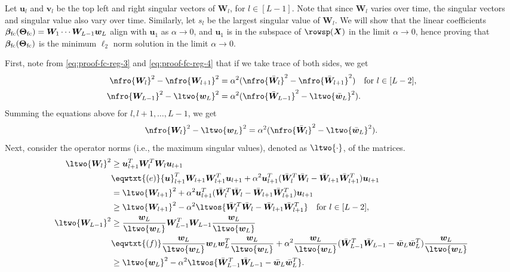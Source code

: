\documentclass{article} %
\def\vu{{\bm{u}}}
\def\vv{{\bm{v}}}
\def\vw{{\bm{w}}}
\def\mW{{\bm{W}}}
\def\mX{{\bm{X}}}
\newcommand{\vbeta}{{\bm{\beta}}}
\newcommand{\vbetafc}{\vbeta_{\rm fc}}
\newcommand{\bTheta}{\bm{\Theta}}
\newcommand{\bThetafc}{\bTheta_{\rm fc}}
\begin{document}
Let $\vu_l$ and $\vv_l$ be the top left and right singular vectors of $\mW_l$, for $l \in [L-1]$. Note that since $\mW_l$ varies over time, the singular vectors and singular value also vary over time. Similarly, let $s_l$ be the largest singular value of $\mW_l$. We will show that the linear coefficients $\vbetafc(\bThetafc) = \mW_1\cdots\mW_{L-1}\vw_L$ align with $\vu_1$ as $\alpha \to 0$, and $\vu_1$ is in the subspace of $\rowsp(\mX)$ in the limit $\alpha \to 0$, hence proving that $\vbetafc(\bThetafc)$ is the minimum $\ell_2$ norm solution in the limit $\alpha \to 0$.

First, note from \eqref{eq:proof-fc-reg-3} and \eqref{eq:proof-fc-reg-4} that if we take trace of both sides, we get
\begin{align*}
    \nfro{\mW_l}^2 - \nfro{\mW_{l+1}}^2 &= \alpha^2 (\nfro{\bar \mW_l}^2 - \nfro{\bar \mW_{l+1}}^2)~~\text{ for } l \in [L-2],\\
    \nfro{\mW_{L-1}}^2 - \ltwo{\vw_L}^2 &= \alpha^2 (\nfro{\bar \mW_{L-1}}^2 - \ltwo{\bar \vw_L}^2).
\end{align*}
Summing the equations above for $l, l+1, \dots, L-1$, we get
\begin{equation}
\label{eq:proof-fc-reg-7}
    \nfro{\mW_l}^2 - \ltwo{\vw_L}^2 = \alpha^2(\nfro{\bar \mW_l}^2 - \ltwo{\bar \vw_L}^2).
\end{equation}
Next, consider the operator norms (i.e., the maximum singular values), denoted as $\ltwo{\cdot}$, of the matrices.
\begin{align*}
    \ltwo{\mW_l}^2 
    &\geq \vu_{l+1}^T \mW_l^T \mW_l \vu_{l+1}\\
    &\eqwtxt{(e)} \vu_{l+1}^T \mW_{l+1} \mW_{l+1}^T \vu_{l+1}
    + \alpha^2 \vu_{l+1}^T (\bar \mW_{l}^T \bar \mW_{l}- \bar \mW_{l+1} \bar \mW_{l+1}^T) \vu_{l+1}\\
    &= \ltwo{\mW_{l+1}}^2 + \alpha^2 \vu_{l+1}^T (\bar \mW_{l}^T \bar \mW_{l}- \bar \mW_{l+1} \bar \mW_{l+1}^T) \vu_{l+1}\\
    &\geq \ltwo{\mW_{l+1}}^2 - \alpha^2 \ltwos{\bar \mW_{l}^T \bar \mW_{l}- \bar \mW_{l+1} \bar \mW_{l+1}^T}~~\text{ for } l \in [L-2],\\
    \ltwo{\mW_{L-1}}^2
    &\geq \frac{\vw_L}{\ltwo{\vw_L}} \mW_{L-1}^T \mW_{L-1} \frac{\vw_L}{\ltwo{\vw_L}}\\
    &\eqwtxt{(f)} \frac{\vw_L}{\ltwo{\vw_L}} \vw_L \vw_L^T \frac{\vw_L}{\ltwo{\vw_L}} + \alpha^2 \frac{\vw_L}{\ltwo{\vw_L}} (\bar \mW_{L-1}^T \bar \mW_{L-1} - \bar \vw_L \bar \vw_L^T) \frac{\vw_L}{\ltwo{\vw_L}}\\
    &\geq \ltwo{\vw_L}^2 - \alpha^2 \ltwos{\bar \mW_{L-1}^T \bar \mW_{L-1} - \bar \vw_L \bar \vw_L^T}.
\end{align*}
\end{document}
